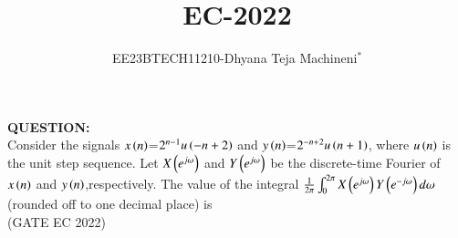 \documentclass[journal,12pt,twocolumn]{IEEEtran}
\theoremstyle{remark}
\begin{document}

\vspace{3cm}
\title{\textbf{EC-2022}}
\author{EE23BTECH11210-Dhyana Teja Machineni$^{*}$%
}
\maketitle
\newpage
\bigskip

\textbf{QUESTION:}\\
Consider the signals $x\left(n\right)$=$2^{n-1} u\left( -n+2\right)$ and $y\left(n\right)$=$2^{-n+2}u\left( n+1\right)$, where $u\left(n\right)$ is the unit step sequence. Let $X\left(e^{j\omega}\right)$ and $Y\left(e^{j\omega}\right)$ be the discrete-time Fourier of $x\left(n\right)$ and $y\left(n\right)$,respectively. The value of the integral $\frac{1}{2\pi}\int_{0}^{2\pi} X\left(e^{j\omega}\right) Y\left(e^{-j\omega}\right) d \omega$
(rounded off to one decimal place) is \underline{{\hspace{1.5in}}}\\
\hfill{(GATE EC 2022)}\\
\end{document}
